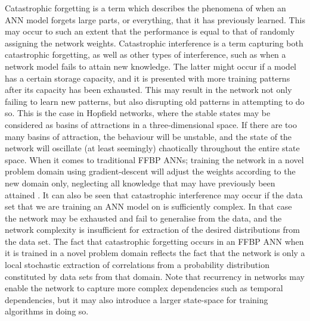 Catastrophic forgetting \citep{McCloskey1989, Ratcliff1990} is a term which describes the phenomena of when an ANN model forgets large parts, or everything, that it has previously learned. This may occur to such an extent that the performance is equal to that of randomly assigning the network weights. Catastrophic interference is a term capturing both catastrophic forgetting, as well as other types of interference, such as when a network model fails to attain new knowledge. The latter might occur if a model has a certain storage capacity, and it is presented with more training patterns after its capacity has been exhausted. This may result in the network not only failing to learn new patterns, but also disrupting old patterns in attempting to do so. This is the case in Hopfield networks, where the stable states may be considered as basins of attractions in a three-dimensional space. If there are too many basins of attraction, the behaviour will be unstable, and the state of the network will oscillate (at least seemingly) chaotically throughout the entire state space.
When it comes to traditional FFBP ANNs; training the network in a novel problem domain using gradient-descent will adjust the weights according to the new domain only, neglecting all knowledge that may have previously been attained \citep{McCloskey1989, French1999, French2001}.
It can also be seen that catastrophic interference may occur if the data set that we are training an ANN model on is sufficiently complex. In that case the network may be exhausted and fail to generalise from the data, and the network complexity is insufficient for extraction of the desired distributions from the data set. 
The fact that catastrophic forgetting occurs in an FFBP ANN when it is trained in a novel problem domain reflects the fact that the network is only a local stochastic extraction of correlations from a probability distribution constituted by data sets from that domain. Note that recurrency in networks may enable the network to capture more complex dependencies such as temporal dependencies, but it may also introduce a larger state-space for training algorithms in doing so.
\\


